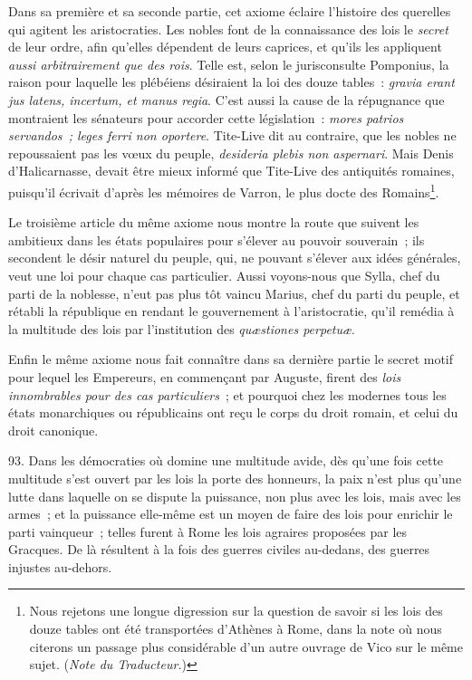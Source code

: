 \documentclass[french,twoside]{book} %
\begin{document}
Dans sa première et sa seconde partie, cet axiome éclaire l’histoire des querelles qui agitent les aristocraties. Les nobles font de la connaissance des lois le {\itshape secret} de leur ordre, afin qu’elles dépendent de leurs caprices, et qu’ils les appliquent {\itshape aussi arbitrairement que des rois}. Telle est, selon le jurisconsulte Pomponius, la raison pour laquelle les plébéiens désiraient la loi des douze tables : \emph{{\itshape gravia erant jus latens, incertum, et manus regia}}. C’est aussi la cause de la répugnance que montraient les sénateurs pour accorder cette législation : \emph{{\itshape mores patrios servandos ; leges ferri non oportere}}. Tite-Live dit au contraire, que les nobles ne repoussaient pas les vœux du peuple, \emph{{\itshape desideria plebis non aspernari}}. Mais Denis d’Halicarnasse, devait être mieux informé que Tite-Live des antiquités romaines, puisqu’il  écrivait d’après les mémoires de Varron, le plus docte des Romains\footnote{Nous rejetons une longue digression sur la question de savoir si les lois des douze tables ont été transportées d’Athènes à Rome, dans la note où nous citerons un passage plus considérable d’un autre ouvrage de Vico sur le même sujet. ({\itshape Note du Traducteur.})}.\par
Le troisième article du même axiome nous montre la route que suivent les ambitieux dans les états populaires pour s’élever au pouvoir souverain ; ils secondent le désir naturel du peuple, qui, ne pouvant s’élever aux idées générales, veut une loi pour chaque cas particulier. Aussi voyons-nous que Sylla, chef du parti de la noblesse, n’eut pas plus tôt vaincu Marius, chef du parti du peuple, et rétabli la république en rendant le gouvernement à l’aristocratie, qu’il remédia à la multitude des lois par l’institution des {\itshape quæstiones perpetuæ}.\par
Enfin le même axiome nous fait connaître dans sa dernière partie le secret motif pour lequel les Empereurs, en commençant par Auguste, firent des {\itshape lois innombrables pour des cas particuliers} ; et pourquoi chez les modernes tous les états monarchiques ou républicains ont reçu le corps du droit romain, et celui du droit canonique.\par
93. Dans les démocraties où domine une multitude avide, dès qu’une fois cette multitude s’est ouvert par les lois la porte des honneurs, la paix n’est plus qu’une lutte dans laquelle on se dispute la puissance, non plus avec les lois, mais avec les  armes ; et la puissance elle-même est un moyen de faire des lois pour enrichir le parti vainqueur ; telles furent à Rome les lois agraires proposées par les Gracques. De là résultent à la fois des guerres civiles au-dedans, des guerres injustes au-dehors.\par
\end{document}
